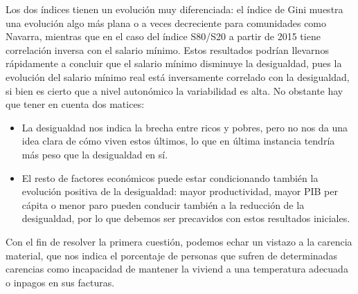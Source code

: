 \documentclass[11pt]{article}
\providecommand{\tightlist}{%
      \setlength{\itemsep}{0pt}\setlength{\parskip}{0pt}}
\begin{document}
    Los dos índices tienen un evolución muy diferenciada: el índice de Gini
muestra una evolución algo más plana o a veces decreciente para
comunidades como Navarra, mientras que en el caso del índice S80/S20 a
partir de 2015 tiene correlación inversa con el salario mínimo. Estos
resultados podrían llevarnos rápidamente a concluir que el salario
mínimo disminuye la desigualdad, pues la evolución del salario mínimo
real está inversamente correlado con la desigualdad, si bien es cierto
que a nivel autonómico la variabilidad es alta. No obstante hay que
tener en cuenta dos matices:

\begin{itemize}
\tightlist
\item
  La desigualdad nos indica la brecha entre ricos y pobres, pero no nos
  da una idea clara de cómo viven estos últimos, lo que en última
  instancia tendría más peso que la desigualdad en sí.
\item
  El resto de factores económicos puede estar condicionando también la
  evolución positiva de la desigualdad: mayor productividad, mayor PIB
  per cápita o menor paro pueden conducir también a la reducción de la
  desigualdad, por lo que debemos ser precavidos con estos resultados
  iniciales.
\end{itemize}

Con el fin de resolver la primera cuestión, podemos echar un vistazo a
la carencia material, que nos indica el porcentaje de personas que
sufren de determinadas carencias como incapacidad de mantener la viviend
a una temperatura adecuada o inpagos en sus facturas.
\end{document}
